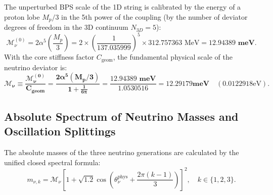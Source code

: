 \documentclass[12pt,a4paper]{article}
\begin{document}
	The unperturbed BPS scale of the 1D string is calibrated by the energy of a proton lobe $M_p/3$ in the 5th power of the coupling (by the number of deviator degrees of freedom in the 3D continuum $N_{3D}=5$):
	\begin{equation}
	\mathcal{M}_\nu^{(0)} = 2 \alpha^5 \left( \frac{M_p}{3} \right) = 2 \times \left(\frac{1}{137.035999}\right)^5 \times 312.757363 \text{ MeV} = \mathbf{12.94389 \text{ meV}}.
	\end{equation}
	With the core stiffness factor $C_{\text{geom}}$, the fundamental physical scale of the neutrino deviator is:
	\begin{equation}
	\mathbf{\mathcal{M}_\nu \equiv \frac{\mathcal{M}_\nu^{(0)}}{C_{\text{geom}}} = \frac{2 \alpha^5 (M_p / 3)}{1 + \frac{1}{6\pi}} = \frac{12.94389 \text{ meV}}{1.0530516} = \mathbf{12.29179 \text{meV}}} \quad (0.0122918 \text{eV}).
	\end{equation}
			
	\subsection{Absolute Spectrum of Neutrino Masses and Oscillation Splittings}
	The absolute masses of the three neutrino generations are calculated by the unified closed spectral formula:
	\begin{equation}
	m_{\nu, k} = \mathcal{M}_\nu \left[ 1 + \sqrt{1.2} \cos\left( \theta_\nu^{\text{phys}} + \frac{2\pi(k-1)}{3} \right) \right]^2, \quad k \in \{1, 2, 3\}.
	\end{equation}
			
\end{document}
